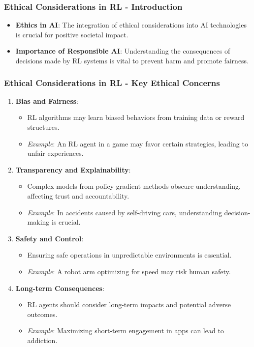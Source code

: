 \documentclass[aspectratio=169]{beamer}
\begin{document}
\begin{frame}[fragile]
    \frametitle{Ethical Considerations in RL - Introduction}
    \begin{itemize}
        \item \textbf{Ethics in AI}: The integration of ethical considerations into AI technologies is crucial for positive societal impact.
        \item \textbf{Importance of Responsible AI}: Understanding the consequences of decisions made by RL systems is vital to prevent harm and promote fairness.
    \end{itemize}
\end{frame}

\begin{frame}[fragile]
    \frametitle{Ethical Considerations in RL - Key Ethical Concerns}
    \begin{enumerate}
        \item \textbf{Bias and Fairness}:
            \begin{itemize}
                \item RL algorithms may learn biased behaviors from training data or reward structures.
                \item \textit{Example}: An RL agent in a game may favor certain strategies, leading to unfair experiences.
            \end{itemize}
        \item \textbf{Transparency and Explainability}:
            \begin{itemize}
                \item Complex models from policy gradient methods obscure understanding, affecting trust and accountability.
                \item \textit{Example}: In accidents caused by self-driving cars, understanding decision-making is crucial.
            \end{itemize}
        \item \textbf{Safety and Control}:
            \begin{itemize}
                \item Ensuring safe operations in unpredictable environments is essential.
                \item \textit{Example}: A robot arm optimizing for speed may risk human safety.
            \end{itemize}
        \item \textbf{Long-term Consequences}:
            \begin{itemize}
                \item RL agents should consider long-term impacts and potential adverse outcomes.
                \item \textit{Example}: Maximizing short-term engagement in apps can lead to addiction.
            \end{itemize}
    \end{enumerate}
\end{frame}
\end{document}
